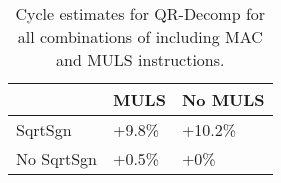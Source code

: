 \begin{table}[ht]
\centering
\begin{tabular}{lll}
  \hline
  & MULS & No MULS \\ 
  \hline
SqrtSgn & +9.8\% & +10.2\% \\ 
  No SqrtSgn & +0.5\% & +0\% \\ 
   \hline
\end{tabular}
\caption{Cycle estimates for QR-Decomp for all combinations of including MAC and MULS instructions.} 
\label{tab:instruction}
\end{table}